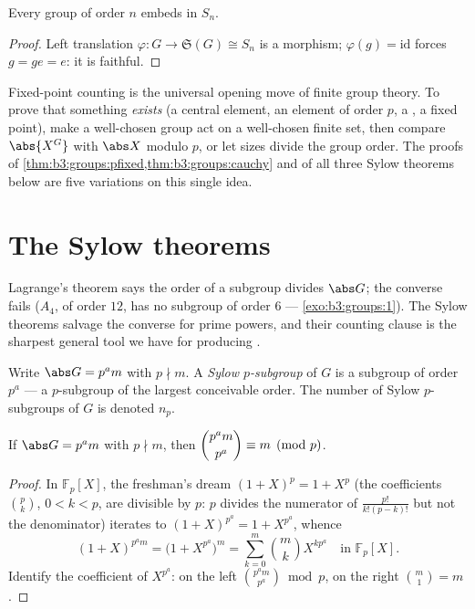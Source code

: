 \begin{theorem}[Cayley]\label{thm:b3:groups:cayley}
Every group of order $n$ embeds in $S_n$.
\end{theorem}

\begin{proof}
Left translation $\varphi \colon G \to \mathfrak S(G) \cong S_n$ is
a morphism; $\varphi(g) = \mathrm{id}$ forces $g = ge = e$: it is
faithful.
\end{proof}

\begin{method}\label{met:b3:groups:counting}
Fixed-point counting is the universal opening move of finite group
theory. To prove that something \emph{exists} (a central element,
an element of order $p$, a , a fixed point), make a
well-chosen group act on a well-chosen finite set, then compare
$\abs{X^G}$ with $\abs X$ modulo $p$, or let  sizes divide the
group order. The proofs of
\cref{thm:b3:groups:pfixed,thm:b3:groups:cauchy} and of all three
Sylow theorems below are five variations on this single idea.
\end{method}

\section{The Sylow theorems}

Lagrange's theorem says the order of a subgroup divides $\abs G$;
the converse fails ($A_4$, of order $12$, has no subgroup of order
$6$ --- \cref{exo:b3:groups:1}). The Sylow theorems salvage the
converse for prime powers, and their counting clause is the
sharpest general tool we have for producing .

\begin{definition}\label{def:b3:groups:sylow}
Write $\abs G = p^a m$ with $p \nmid m$. A \emph{Sylow
$p$-subgroup} of $G$ is a subgroup of order
$p^a$ --- a $p$-subgroup of the largest conceivable order. The
number of Sylow $p$-subgroups of $G$ is denoted $n_p$.
\end{definition}

\begin{lemma}\label{lem:b3:groups:binom}
If $\abs G = p^a m$ with $p \nmid m$, then $\dbinom{p^a m}{p^a}
\equiv m \pmod p$.
\end{lemma}

\begin{proof}
In $\mathbb F_p[X]$, the freshman's dream $(1+X)^p = 1 + X^p$ (the
coefficients $\binom pk$, $0<k<p$, are divisible by $p$: $p$
divides the numerator of $\frac{p!}{k!(p-k)!}$ but not the
denominator) iterates to $(1+X)^{p^a} = 1 + X^{p^a}$, whence
\[
(1+X)^{p^a m} = \bigl(1 + X^{p^a}\bigr)^m
= \sum_{k=0}^{m} \binom mk X^{k p^a} \quad\text{in } \mathbb
F_p[X].
\]
Identify the coefficient of $X^{p^a}$: on the left $\binom{p^a
m}{p^a} \bmod p$, on the right $\binom m1 = m$.
\end{proof}

